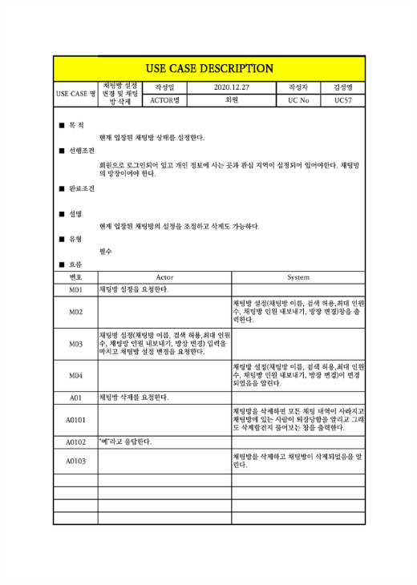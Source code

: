 {{{{{{{{{{{{{{{{{{{{{{{{{{{{{{{{{{{{{{{{{{{{{{{{{{{{{{{{{{{{\includegraphics[width=1.1\textwidth]{./Figure/Design/Display/usecase/057.pdf} \\
}}}}}}}}}}}}}}}}}}}}}}}}}}}}}}}}}}}}}}}}}}}}}}}}}}}}}}}}}}}}
